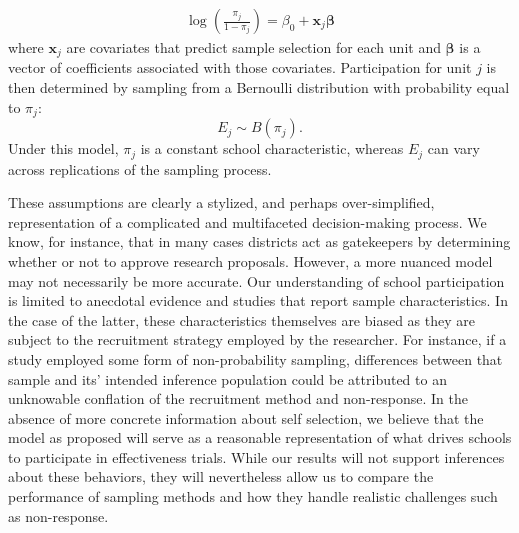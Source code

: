 \documentclass[
  english,
  man,floatsintext]{apa6}
\begin{document}
\begin{align}
\label{eq:RGM}
\log\left(\frac{\pi_j}{1 - \pi_j}\right) = \beta_0 + \mathbf{x}_j \boldsymbol\beta
\end{align}
where \(\mathbf{x}_j\) are covariates that predict sample selection for each unit and \(\boldsymbol\beta\) is a vector of coefficients associated with those covariates. Participation for unit \(j\) is then determined by sampling from a Bernoulli distribution with probability equal to \(\pi_j\):
\begin{equation}
\label{eq:Ej}
E_j \sim B(\pi_j).
\end{equation}
Under this model, \(\pi_j\) is a constant school characteristic, whereas \(E_j\) can vary across replications of the sampling process.

These assumptions are clearly a stylized, and perhaps over-simplified, representation of a complicated and multifaceted decision-making process.
We know, for instance, that in many cases districts act as gatekeepers by determining whether or not to approve research proposals.
However, a more nuanced model may not necessarily be more accurate.
Our understanding of school participation is limited to anecdotal evidence and studies that report sample characteristics.
In the case of the latter, these characteristics themselves are biased as they are subject to the recruitment strategy employed by the researcher. For instance, if a study employed some form of non-probability sampling, differences between that sample and its' intended inference population could be attributed to an unknowable conflation of the recruitment method and non-response.
In the absence of more concrete information about self selection, we believe that the model as proposed will serve as a reasonable representation of what drives schools to participate in effectiveness trials.
While our results will not support inferences about these behaviors, they will nevertheless allow us to compare the performance of sampling methods and how they handle realistic challenges such as non-response.
\end{document}
